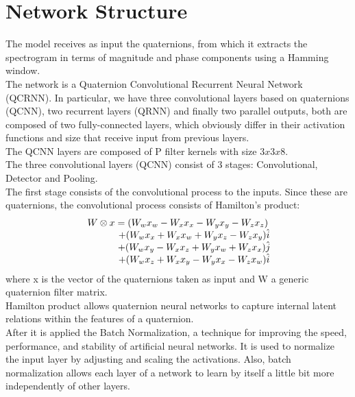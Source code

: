 \documentclass{article}
\begin{document}
    \section{Network Structure}
    The model receives as input the quaternions, from which it extracts the spectrogram in terms of magnitude and phase components 
    using a Hamming window.
    \\ The network is a Quaternion Convolutional Recurrent Neural Network (QCRNN).
    In particular, we have three convolutional layers based on quaternions (QCNN), two recurrent layers (QRNN) and finally two parallel 
    outputs, both are composed of two fully-connected layers, which obviously differ in their activation functions and size that 
    receive input from previous layers.
    \\ The QCNN layers are composed of P filter kernels with size $3x3x8$. 
    \\ The three convolutional layers (QCNN) consist of 3 stages: Convolutional, Detector and  Pooling.
    \\ The first stage consists of the convolutional process to the inputs. Since these are quaternions, the convolutional process 
    consists of Hamilton's product:
    \begin{equation*}
        \begin{matrix}
            W \otimes x =(W_wx_w - W_xx_x - W_yx_y - W_zx_z ) \\
               \hspace{1.2cm} + (W_wx_x + W_xx_w + W_yx_z - W_zx_y )\hat{i} \\
               \hspace{1.2cm} + (W_wx_y - W_xx_z + W_yx_w + W_zx_x )\hat{j} \\
               \hspace{1.2cm} + (W_wx_z + W_xx_y - W_yx_x - W_zx_w )\hat{i}
        \end{matrix}
    \end{equation*}
    where x is the vector of the quaternions taken as input and W a generic quaternion filter matrix.
    \\ Hamilton product allows quaternion neural networks to capture internal latent relations within the features of a quaternion.
    \\ After it is applied the Batch Normalization, a technique for improving the speed, performance, and stability of artificial 
    neural networks. It is used to normalize the input layer by adjusting and scaling the activations.
    Also, batch normalization allows each layer of a network to learn by itself a little bit more independently of other layers.
\end{document}
